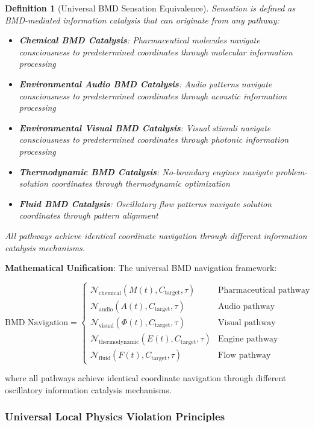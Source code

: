 \documentclass[11pt,a4paper]{article}
\newtheorem{definition}[theorem]{Definition}
\theoremstyle{remark}
\begin{document}
\begin{definition}[Universal BMD Sensation Equivalence]
Sensation is defined as BMD-mediated information catalysis that can originate from any pathway:
\begin{itemize}
\item \textbf{Chemical BMD Catalysis}: Pharmaceutical molecules navigate consciousness to predetermined coordinates through molecular information processing
\item \textbf{Environmental Audio BMD Catalysis}: Audio patterns navigate consciousness to predetermined coordinates through acoustic information processing
\item \textbf{Environmental Visual BMD Catalysis}: Visual stimuli navigate consciousness to predetermined coordinates through photonic information processing
\item \textbf{Thermodynamic BMD Catalysis}: No-boundary engines navigate problem-solution coordinates through thermodynamic optimization
\item \textbf{Fluid BMD Catalysis}: Oscillatory flow patterns navigate solution coordinates through pattern alignment
\end{itemize}
All pathways achieve identical coordinate navigation through different information catalysis mechanisms.
\end{definition}

\textbf{Mathematical Unification}:
The universal BMD navigation framework:

\begin{equation}
\text{BMD Navigation} = \begin{cases}
\mathcal{N}_{\text{chemical}}(M(t), C_{\text{target}}, \tau) & \text{Pharmaceutical pathway} \\
\mathcal{N}_{\text{audio}}(A(t), C_{\text{target}}, \tau) & \text{Audio pathway} \\
\mathcal{N}_{\text{visual}}(\Phi(t), C_{\text{target}}, \tau) & \text{Visual pathway} \\
\mathcal{N}_{\text{thermodynamic}}(E(t), C_{\text{target}}, \tau) & \text{Engine pathway} \\
\mathcal{N}_{\text{fluid}}(F(t), C_{\text{target}}, \tau) & \text{Flow pathway}
\end{cases}
\end{equation}

where all pathways achieve identical coordinate navigation through different oscillatory information catalysis mechanisms.

\subsubsection{Universal Local Physics Violation Principles}
\end{document}
